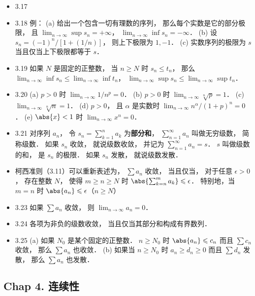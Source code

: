 \begin{itemize}
\item 3.17 

\item 3.18 例： (a) 给出一个包含一切有理数的序列， 那么每个实数是它的部分极限， 且 $\lim_{n\to\infty}\sup s_n = +\infty$， $\lim_{n\to\infty}\inf s_n = -\infty$． (b) 设 $s_n = (-1)^n/[1+(1/n)]$， 则上下极限为 $1,-1$． (c) 实数序列的极限为 $s$ 当且仅当上下极限都等于 $s$．

\item 3.19 如果 $N$ 是固定的正整数， 当 $n\geqslant N$ 时 $s_n \leqslant t_n$， 那么 $\lim_{n\to\infty}\inf s_n \leqslant \lim_{n\to\infty}\inf t_n$， $\lim_{n\to\infty}\sup s_n \leqslant \lim_{n\to\infty}\sup t_n$．

\item 3.20 (a) $p > 0$ 时 $\lim_{n\to\infty}1/n^p = 0$． (b) $p>0$ 时 $\lim_{n\to\infty}{}\sqrt[n]{p} = 1$． (c) $\lim_{n\to\infty} \sqrt[n]{n} = 1$． (d) $p>0$， 且 $\alpha$ 是实数时 $\lim_{n\to\infty} n^\alpha/(1+p)^n = 0$． (e) $\abs{x}<1$ 时 $\lim_{n\to\infty} x^n = 0$．

\item 3.21 对序列 ${a_n}$， 令 $s_n = \sum_{k=1}^n a_k$ 为\textbf{部分和}， $\sum_{n=1}^\infty a_n$ 叫做无穷级数， 简称级数． 如果 $s_n$ 收敛， 就说级数收敛， 并记为 $\sum_{n=1}^\infty a_n = s$． $s$ 叫做级数的和， 是 $s_n$ 的极限． 如果 $s_n$ 发散， 就说级数发散．

\item 柯西准则（3.11）可以重新表述为， $\sum a_n$ 收敛， 当且仅当， 对于任意 $\epsilon>0$， 存在整数 $N$， 使得 $m \geqslant n \geqslant N$ 时 $\abs{\sum_{k=n}^m a_k} \leqslant \epsilon$． 特别地，当 $m=n$ 时 $\abs{a_n}\leqslant\epsilon$（$n\geqslant N$）

\item 3.23 如果 $\sum a_n$ 收敛， 则 $\lim_{n\to\infty} a_n = 0$．

\item 3.24 各项为非负的级数收敛， 当且仅当其部分和构成有界数列．

\item 3.25 (a) 如果 $N_0$ 是某个固定的正整数． $n \geqslant N_0$ 时 $\abs{a_n}\leqslant c_n$ 而且 $\sum c_n$ 收敛， 那么 $\sum a_n$ 也收敛． (b) 如果当 $n\geqslant N_0$ 时 $a_n\geqslant d_n\geqslant 0$ 而且 $\sum d_n$ 发散， 那么 $\sum a_n$ 也发散．
\end{itemize}


\subsection{Chap 4. 连续性}

